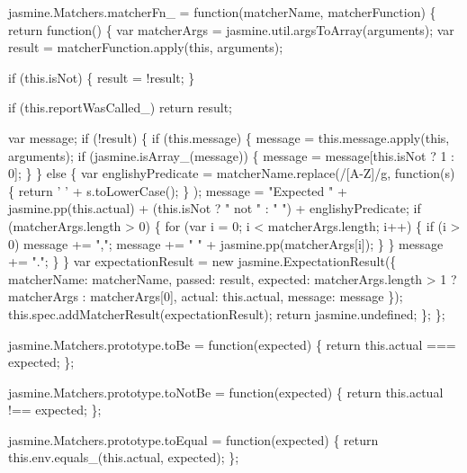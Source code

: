 \begin{DoxyCodeInclude}
jasmine.Matchers.matcherFn\_ = \textcolor{keyword}{function}(matcherName, matcherFunction) \{
  \textcolor{keywordflow}{return} \textcolor{keyword}{function}() \{
    var matcherArgs = jasmine.util.argsToArray(arguments);
    var result = matcherFunction.apply(\textcolor{keyword}{this}, arguments);

    \textcolor{keywordflow}{if} (this.isNot) \{
      result = !result;
    \}

    \textcolor{keywordflow}{if} (this.reportWasCalled\_) \textcolor{keywordflow}{return} result;

    var message;
    \textcolor{keywordflow}{if} (!result) \{
      \textcolor{keywordflow}{if} (this.message) \{
        message = this.message.apply(\textcolor{keyword}{this}, arguments);
        \textcolor{keywordflow}{if} (jasmine.isArray\_(message)) \{
          message = message[this.isNot ? 1 : 0];
        \}
      \} \textcolor{keywordflow}{else} \{
        var englishyPredicate = matcherName.replace(/[A-Z]/g, \textcolor{keyword}{function}(s) \{ \textcolor{keywordflow}{return} \textcolor{charliteral}{' '} + s.toLowerCase(); \}
      );
        message = \textcolor{stringliteral}{"Expected "} + jasmine.pp(this.actual) + (this.isNot ? \textcolor{stringliteral}{" not "} : \textcolor{stringliteral}{" "}) + englishyPredicate;
        \textcolor{keywordflow}{if} (matcherArgs.length > 0) \{
          \textcolor{keywordflow}{for} (var i = 0; i < matcherArgs.length; i++) \{
            \textcolor{keywordflow}{if} (i > 0) message += \textcolor{stringliteral}{","};
            message += \textcolor{stringliteral}{" "} + jasmine.pp(matcherArgs[i]);
          \}
        \}
        message += \textcolor{stringliteral}{"."};
      \}
    \}
    var expectationResult = \textcolor{keyword}{new} jasmine.ExpectationResult(\{
      matcherName: matcherName,
      passed: result,
      expected: matcherArgs.length > 1 ? matcherArgs : matcherArgs[0],
      actual: this.actual,
      message: message
    \});
    this.spec.addMatcherResult(expectationResult);
    \textcolor{keywordflow}{return} jasmine.undefined;
  \};
\};




jasmine.Matchers.prototype.toBe = \textcolor{keyword}{function}(expected) \{
  \textcolor{keywordflow}{return} this.actual === expected;
\};

jasmine.Matchers.prototype.toNotBe = \textcolor{keyword}{function}(expected) \{
  \textcolor{keywordflow}{return} this.actual !== expected;
\};

jasmine.Matchers.prototype.toEqual = \textcolor{keyword}{function}(expected) \{
  \textcolor{keywordflow}{return} this.env.equals\_(this.actual, expected);
\};


\end{DoxyCodeInclude}
